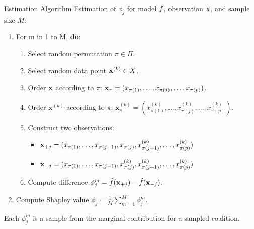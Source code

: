 \documentclass[11pt,compress,t,notes=noshow, aspectratio=169, xcolor=table]{beamer}
\begin{document}
\newcommand{\xk}{\mathbf{x}^{(k)}}

\begin{vbframe}{Estimation Algorithm }
Estimation of $\phi_j$ for model $\fh$, observation $\xv$, and sample size $M$:
\vspace{0.25cm}
  \begin{enumerate}
      \item For m in 1 to M, \textbf{do}:
      \begin{enumerate}
        \item Select random permutation $\pi \in \Pi$.
        \item Select random data point $\xv^{(k)} \in X$.
        \item Order $\xv$ according to $\pi$: $\xv_{\pi} = (x_{\pi(1)}, \ldots, x_{\pi(j)}, \ldots, x_{\pi(p)})$.
        \item Order $\xk$ according to $\pi$: $\xk_{\pi} = (x^{(k)}_{\pi(1)}, \ldots, x^{(k)}_{\pi(j)}, \ldots, x^{(k)}_{\pi(p)})$.
        \item Construct two observations:
          \begin{itemize}
          \setlength\itemsep{.5em}
            \item $\xv_{+j} = (x_{\pi(1)}, \ldots, x_{\pi(j - 1)}, x_{\pi(j)}, x^{(k)}_{\pi(j + 1)}, \ldots, x^{(k)}_{\pi(p)}) $
            \item $\xv_{-j} = (x_{\pi(1)}, \ldots, x_{\pi(j - 1)}, x^{(k)}_{\pi(j)}, x^{(k)}_{\pi(j + 1)}, \ldots, x^{(k)}_{\pi(p)}) $
          \end{itemize}
        \item Compute difference $\phi_j^m = \fh(\xv_{+j}) - \fh(\xv_{-j})$.
      \end{enumerate}
    \item Compute Shapley value $\phi_j = \frac{1}{M}\sum_{m=1}^M \phi_j^m$.
  \end{enumerate}

  Each $\phi_j^m$ is a sample from the marginal contribution for a sampled coalition.


\end{vbframe}
\end{document}
